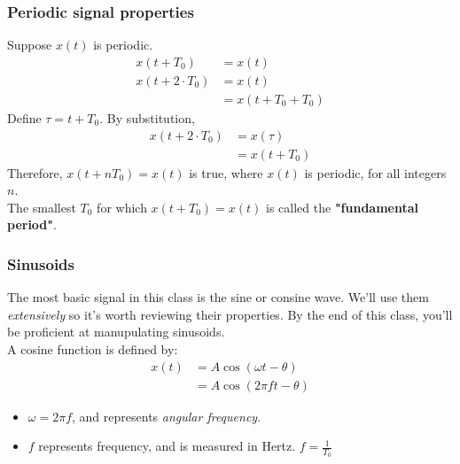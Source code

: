 \documentclass[10pt]{article}
\begin{document}
\subsubsection*{Periodic signal properties}
Suppose $x(t)$ is periodic.
\begin{align*}
    x(t + T_0) &= x(t)\\
    x(t + 2 \cdot T_0) &= x(t)\\
    &= x(t + T_0 + T_0)
\end{align*}
Define $\tau = t + T_0$.  By substitution,
\begin{align*}
    x(t + 2 \cdot T_0) &= x(\tau)\\
    &= x(t + T_0)
\end{align*}
Therefore, $x(t + nT_0) = x(t)$ is true, where $x(t)$ is periodic, for all integers $n$.\\
The smallest $T_0$ for which $x(t + T_0) = x(t)$ is called the \textbf{"fundamental period"}.

\subsubsection*{Sinusoids}
The most basic signal in this class is the sine or consine wave.  We'll use them \textit{extensively} so it's worth reviewing their properties.  By the end of this class, you'll be proficient at manupulating sinusoids.\\
A cosine function is defined by:
\begin{align*}
    x(t) &= A \cos(\omega t - \theta) \\
    &= A \cos(2\pi ft - \theta)
\end{align*}
\begin{itemize}
    \item $\omega = 2 \pi f$, and represents \textit{angular frequency}.
    \item $f$ represents frequency, and is measured in Hertz.  $f = \frac{1}{T_0}$
\end{itemize}
\end{document}
